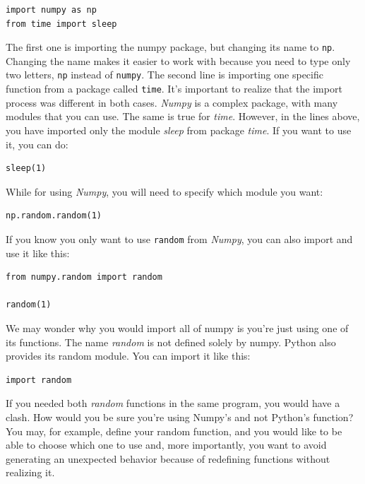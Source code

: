\begin{verbatim}
import numpy as np
from time import sleep
\end{verbatim}

The first one is importing the numpy package, but changing its name to \texttt{np}. Changing the name makes it easier to work with because you need to type only two letters, \texttt{np} instead of \texttt{numpy}. The second line is importing one specific function from a package called \texttt{time}. It's important to realize that the import process was different in both cases. \emph{Numpy} is a complex package, with many modules that you can use. The same is true for \emph{time}. However, in the lines above, you have imported only the module \emph{sleep} from package \emph{time}. If you want to use it, you can do:

\begin{verbatim}
sleep(1)
\end{verbatim}

While for using \emph{Numpy}, you will need to specify which module you want:

\begin{verbatim}
np.random.random(1)
\end{verbatim}

If you know you only want to use \texttt{random} from \emph{Numpy}, you can also import and use it like this:

\begin{verbatim}
from numpy.random import random

random(1)
\end{verbatim}

We may wonder why you would import all of numpy is you're just using one of its functions. The name \emph{random} is not defined solely by numpy. Python also provides its random module. You can import it like this:

\begin{verbatim}
import random
\end{verbatim}

If you needed both \emph{random} functions in the same program, you would have a clash. How would you be sure you're using Numpy's and not Python's function? You may, for example, define your random function, and you would like to be able to choose which one to use and, more importantly, you want to avoid generating an unexpected behavior because of redefining functions without realizing it.

